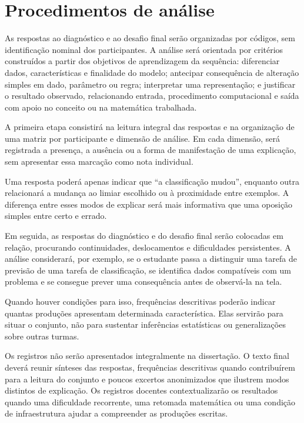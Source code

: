 \section{Procedimentos de análise}

As respostas ao diagnóstico e ao desafio final serão organizadas por códigos, sem identificação nominal dos participantes. A análise será orientada por critérios construídos a partir dos objetivos de aprendizagem da sequência: diferenciar dados, características e finalidade do modelo; antecipar consequência de alteração simples em dado, parâmetro ou regra; interpretar uma representação; e justificar o resultado observado, relacionando entrada, procedimento computacional e saída com apoio no conceito ou na matemática trabalhada.

A primeira etapa consistirá na leitura integral das respostas e na organização de uma matriz por participante e dimensão de análise. Em cada dimensão, será registrada a presença, a ausência ou a forma de manifestação de uma explicação, sem apresentar essa marcação como nota individual.

Uma resposta poderá apenas indicar que ``a classificação mudou'', enquanto outra relacionará a mudança ao limiar escolhido ou à proximidade entre exemplos. A diferença entre esses modos de explicar será mais informativa que uma oposição simples entre certo e errado.

Em seguida, as respostas do diagnóstico e do desafio final serão colocadas em relação, procurando continuidades, deslocamentos e dificuldades persistentes. A análise considerará, por exemplo, se o estudante passa a distinguir uma tarefa de previsão de uma tarefa de classificação, se identifica dados compatíveis com um problema e se consegue prever uma consequência antes de observá-la na tela.

Quando houver condições para isso, frequências descritivas poderão indicar quantas produções apresentam determinada característica. Elas servirão para situar o conjunto, não para sustentar inferências estatísticas ou generalizações sobre outras turmas.

Os registros não serão apresentados integralmente na dissertação. O texto final deverá reunir sínteses das respostas, frequências descritivas quando contribuírem para a leitura do conjunto e poucos excertos anonimizados que ilustrem modos distintos de explicação. Os registros docentes contextualizarão os resultados quando uma dificuldade recorrente, uma retomada matemática ou uma condição de infraestrutura ajudar a compreender as produções escritas.

